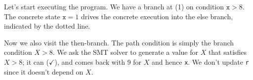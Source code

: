 \documentclass[11pt]{article}
\begin{document}
Let's start executing the program. We have a branch at (1) on condition
$\texttt{x} > 8$. The concrete state $\texttt{x}=1$ drives the concrete execution
into the else branch, indicated by the dotted line.

\begin{center}
\end{center}
Now we also visit the then-branch. The path condition is simply the branch condition $X > 8$.
We ask the SMT solver to generate a value for $X$ that satisfies $X > 8$; it can ($\checkmark$), and comes back with 9 for $X$
and hence \texttt{x}.
We don't update \texttt{r} since it doesn't depend on $X$.
\end{document}
